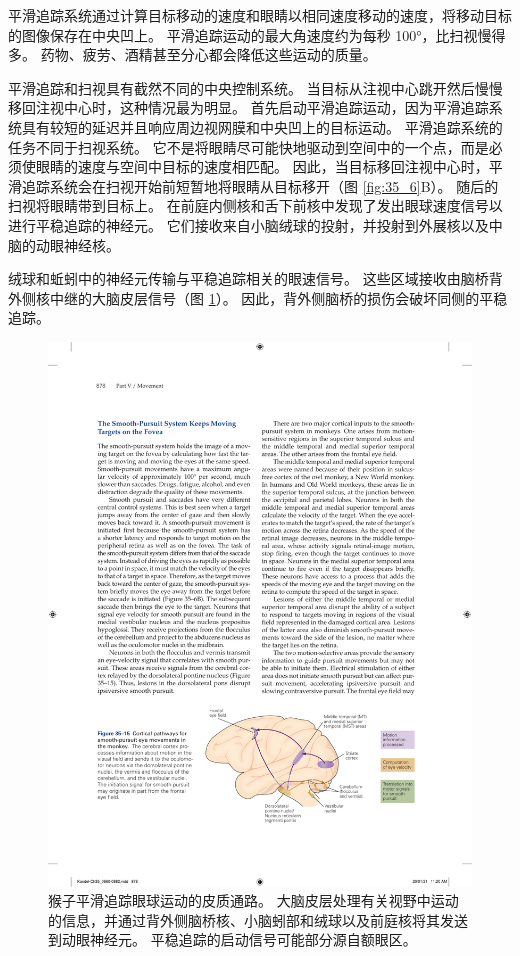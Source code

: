 平滑追踪系统通过计算目标移动的速度和眼睛以相同速度移动的速度，将移动目标的图像保存在中央凹上。
平滑追踪运动的最大角速度约为每秒 100°，比扫视慢得多。 药物、疲劳、酒精甚至分心都会降低这些运动的质量。


平滑追踪和扫视具有截然不同的中央控制系统。
当目标从注视中心跳开然后慢慢移回注视中心时，这种情况最为明显。
首先启动平滑追踪运动，因为平滑追踪系统具有较短的延迟并且响应周边视网膜和中央凹上的目标运动。
平滑追踪系统的任务不同于扫视系统。
它不是将眼睛尽可能快地驱动到空间中的一个点，而是必须使眼睛的速度与空间中目标的速度相匹配。
因此，当目标移回注视中心时，平滑追踪系统会在扫视开始前短暂地将眼睛从目标移开（图 \ref{fig:35_6}B）。
随后的扫视将眼睛带到目标上。
在前庭内侧核和舌下前核中发现了发出眼球速度信号以进行平稳追踪的神经元。
它们接收来自小脑绒球的投射，并投射到外展核以及中脑的动眼神经核。


绒球和蚯蚓中的神经元传输与平稳追踪相关的眼速信号。 
这些区域接收由脑桥背外侧核中继的大脑皮层信号（图 \ref{fig:35_15}）。
因此，背外侧脑桥的损伤会破坏同侧的平稳追踪。


\begin{figure}[htbp]
	\centering
	\includegraphics[width=0.7\linewidth]{chap35/fig_35_15}
	\caption{猴子平滑追踪眼球运动的皮质通路。 大脑皮层处理有关视野中运动的信息，并通过背外侧脑桥核、小脑蚓部和绒球以及前庭核将其发送到动眼神经元。 平稳追踪的启动信号可能部分源自额眼区。}
	\label{fig:35_15}
\end{figure}

